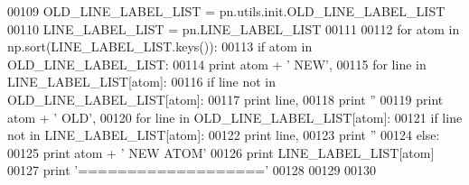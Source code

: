 \begin{DoxyCode}
00109     OLD\_LINE\_LABEL\_LIST = pn.utils.init.OLD\_LINE\_LABEL\_LIST
00110     LINE\_LABEL\_LIST = pn.LINE\_LABEL\_LIST
00111     
00112     \textcolor{keywordflow}{for} atom \textcolor{keywordflow}{in} np.sort(LINE\_LABEL\_LIST.keys()):
00113         \textcolor{keywordflow}{if} atom \textcolor{keywordflow}{in} OLD\_LINE\_LABEL\_LIST:
00114             \textcolor{keywordflow}{print} atom + \textcolor{stringliteral}{' NEW'},
00115             \textcolor{keywordflow}{for} line \textcolor{keywordflow}{in} LINE\_LABEL\_LIST[atom]:
00116                 \textcolor{keywordflow}{if} line \textcolor{keywordflow}{not} \textcolor{keywordflow}{in} OLD\_LINE\_LABEL\_LIST[atom]:
00117                     \textcolor{keywordflow}{print} line,
00118             \textcolor{keywordflow}{print} \textcolor{stringliteral}{''}
00119             \textcolor{keywordflow}{print} atom + \textcolor{stringliteral}{' OLD'},
00120             \textcolor{keywordflow}{for} line \textcolor{keywordflow}{in} OLD\_LINE\_LABEL\_LIST[atom]:
00121                 \textcolor{keywordflow}{if} line \textcolor{keywordflow}{not} \textcolor{keywordflow}{in} LINE\_LABEL\_LIST[atom]:
00122                     \textcolor{keywordflow}{print} line,
00123             \textcolor{keywordflow}{print} \textcolor{stringliteral}{''}
00124         \textcolor{keywordflow}{else}:
00125             \textcolor{keywordflow}{print} atom + \textcolor{stringliteral}{' NEW ATOM'}
00126             \textcolor{keywordflow}{print} LINE\_LABEL\_LIST[atom]
00127         \textcolor{keywordflow}{print} \textcolor{stringliteral}{'==================='}
00128         
00129         
00130                     
\end{DoxyCode}
